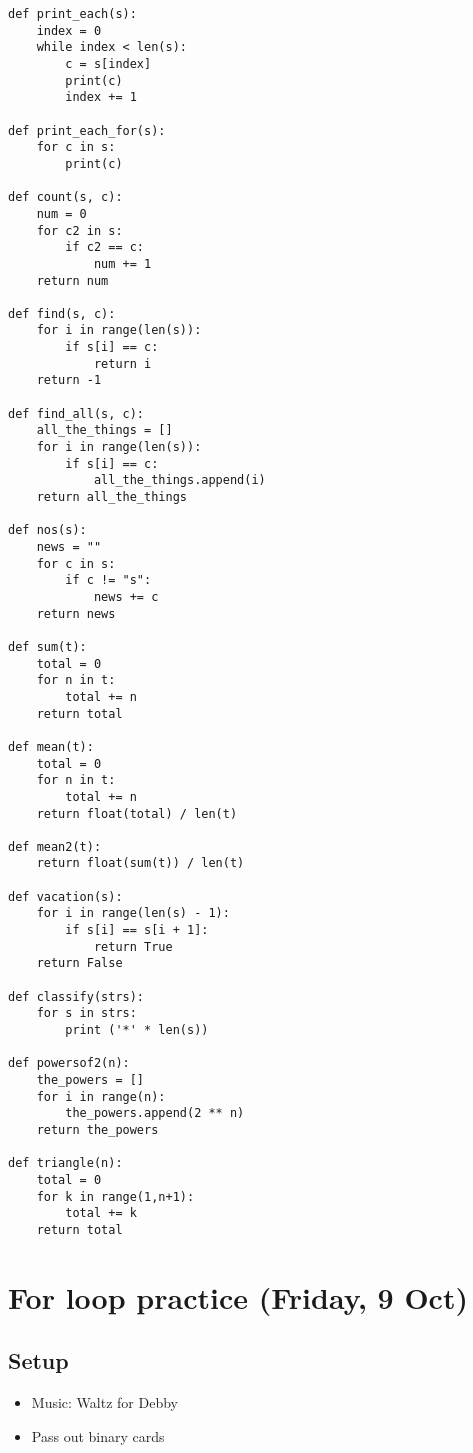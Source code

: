 \documentclass{article}
\begin{document}
\begin{verbatim}
def print_each(s):
    index = 0
    while index < len(s):
        c = s[index]
        print(c)
        index += 1

def print_each_for(s):
    for c in s:
        print(c)

def count(s, c):
    num = 0
    for c2 in s:
        if c2 == c:
            num += 1
    return num

def find(s, c):
    for i in range(len(s)):
        if s[i] == c:
            return i
    return -1

def find_all(s, c):
    all_the_things = []
    for i in range(len(s)):
        if s[i] == c:
            all_the_things.append(i)
    return all_the_things

def nos(s):
    news = ""
    for c in s:
        if c != "s":
            news += c
    return news

def sum(t):
    total = 0
    for n in t:
        total += n
    return total

def mean(t):
    total = 0
    for n in t:
        total += n
    return float(total) / len(t)

def mean2(t):
    return float(sum(t)) / len(t)

def vacation(s):
    for i in range(len(s) - 1):
        if s[i] == s[i + 1]:
            return True
    return False

def classify(strs):
    for s in strs:
        print ('*' * len(s))

def powersof2(n):
    the_powers = []
    for i in range(n):
        the_powers.append(2 ** n)
    return the_powers

def triangle(n):
    total = 0
    for k in range(1,n+1):
        total += k
    return total
\end{verbatim}

\section*{For loop practice (Friday, 9 Oct)}

\subsection*{Setup}
\begin{itemize}
\item Music: Waltz for Debby
\item Pass out binary cards
\end{itemize}
\end{document}
